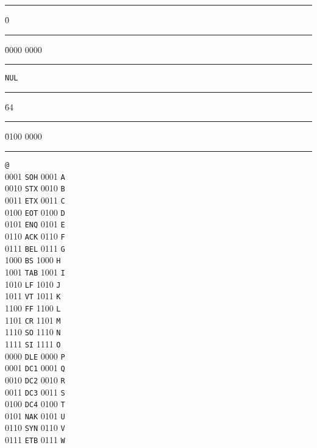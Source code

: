 \begin{tabbing}
\rule{24pt}{0pt} \=0 \rule{24pt}{0pt} \=0000 0000  \rule{24pt}{0pt} \=\verb+NUL+  \rule{50pt}{0pt} \=64 \rule{24pt}{0pt} \=0100 0000 \rule{24pt}{0pt} \=\verb+@+  \\ 
  0001 \>\verb+SOH+     0001 \>\verb+A+  \\ 
  0010 \>\verb+STX+     0010 \>\verb+B+  \\ 
  0011 \>\verb+ETX+     0011 \>\verb+C+  \\ 
  0100 \>\verb+EOT+     0100 \>\verb+D+  \\ 
  0101 \>\verb+ENQ+     0101 \>\verb+E+  \\ 
  0110 \>\verb+ACK+     0110 \>\verb+F+  \\ 
  0111 \>\verb+BEL+     0111 \>\verb+G+  \\ 
  1000 \>\verb+BS+      1000 \>\verb+H+  \\ 
  1001 \>\verb+TAB+     1001 \>\verb+I+  \\ 
  1010 \>\verb+LF+     1010 \>\verb+J+  \\ 
  1011 \>\verb+VT+     1011 \>\verb+K+  \\ 
  1100 \>\verb+FF+     1100 \>\verb+L+  \\ 
  1101 \>\verb+CR+     1101 \>\verb+M+  \\ 
  1110 \>\verb+SO+     1110 \>\verb+N+  \\ 
  1111 \>\verb+SI+     1111 \>\verb+O+  \\ 
  0000 \>\verb+DLE+    0000 \>\verb+P+  \\ 
  0001 \>\verb+DC1+    0001 \>\verb+Q+  \\ 
  0010 \>\verb+DC2+    0010 \>\verb+R+  \\ 
  0011 \>\verb+DC3+    0011 \>\verb+S+  \\ 
  0100 \>\verb+DC4+    0100 \>\verb+T+  \\ 
  0101 \>\verb+NAK+    0101 \>\verb+U+  \\ 
  0110 \>\verb+SYN+    0110 \>\verb+V+  \\ 
  0111 \>\verb+ETB+    0111 \>\verb+W+  \\ 

\end{tabbing}
